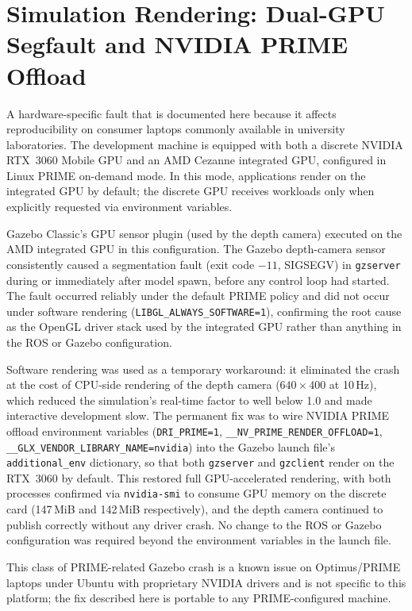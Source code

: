 \section{Simulation Rendering: Dual-GPU Segfault and NVIDIA PRIME Offload}
A hardware-specific fault that is documented here because it affects reproducibility on
consumer laptops commonly available in university laboratories. The development machine
is equipped with both a discrete NVIDIA RTX~3060 Mobile GPU and an AMD Cezanne
integrated GPU, configured in Linux PRIME on-demand mode. In this mode, applications
render on the integrated GPU by default; the discrete GPU receives workloads only when
explicitly requested via environment variables.

Gazebo Classic's GPU sensor plugin (used by the depth camera) executed on the AMD
integrated GPU in this configuration. The Gazebo depth-camera sensor consistently
caused a segmentation fault (exit code $-11$, SIGSEGV) in \texttt{gzserver} during or
immediately after model spawn, before any control loop had started. The fault occurred
reliably under the default PRIME policy and did not occur under software rendering
(\texttt{LIBGL\_ALWAYS\_SOFTWARE=1}), confirming the root cause as the OpenGL driver
stack used by the integrated GPU rather than anything in the ROS or Gazebo configuration.

Software rendering was used as a temporary workaround: it eliminated the crash at the
cost of CPU-side rendering of the depth camera ($640\times400$ at 10\,Hz), which reduced
the simulation's real-time factor to well below 1.0 and made interactive development
slow. The permanent fix was to wire NVIDIA PRIME offload environment variables
(\texttt{DRI\_PRIME=1}, \texttt{\_\_NV\_PRIME\_RENDER\_OFFLOAD=1},
\texttt{\_\_GLX\_VENDOR\_LIBRARY\_NAME=nvidia}) into the Gazebo launch file's
\texttt{additional\_env} dictionary, so that both \texttt{gzserver} and \texttt{gzclient}
render on the RTX~3060 by default. This restored full GPU-accelerated rendering, with
both processes confirmed via \texttt{nvidia-smi} to consume GPU memory on the discrete
card (147\,MiB and 142\,MiB respectively), and the depth camera continued to publish
correctly without any driver crash. No change to the ROS or Gazebo configuration was
required beyond the environment variables in the launch file.

This class of PRIME-related Gazebo crash is a known issue on Optimus/PRIME laptops under
Ubuntu with proprietary NVIDIA drivers and is not specific to this platform; the fix
described here is portable to any PRIME-configured machine.

